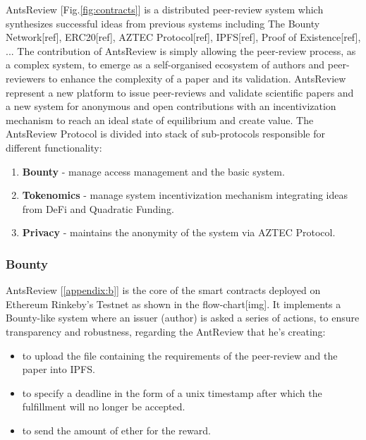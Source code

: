 \documentclass[runningheads]{llncs}
\begin{document}
AntsReview [Fig.\ref{fig:contracts}] is a distributed peer-review system which synthesizes successful ideas from previous systems including The Bounty Network[ref], ERC20[ref], AZTEC Protocol[ref], IPFS[ref], Proof of Existence[ref], ...
\newline The contribution of AntsReview is simply allowing the peer-review process, as a complex system, to emerge as a self-organised ecosystem of authors and peer-reviewers to enhance the complexity of a paper and its validation.
\newline AntsReview represent a new platform to issue peer-reviews and validate scientific papers and a new system for anonymous and open contributions with an incentivization mechanism to reach an ideal state of equilibrium and create value.
\newline The AntsReview Protocol is divided into stack of sub-protocols responsible for different functionality:

\begin{enumerate}
  \item \textbf{Bounty} - manage access management and the basic system.
  \item \textbf{Tokenomics} - manage system incentivization mechanism integrating ideas from DeFi and Quadratic Funding.
  \item \textbf{Privacy} - maintains the anonymity of the system via AZTEC Protocol.
\end{enumerate}

\subsubsection{Bounty}
AntsReview [\ref{appendix:b}] is the core of the smart contracts deployed on Ethereum Rinkeby's Testnet as shown in the flow-chart[img].
\newline It implements a Bounty-like system where an issuer (author) is asked a series of actions, to ensure transparency and robustness, regarding the AntReview that he's creating:
\begin{itemize}
  \item to upload the file containing the requirements of the peer-review and the paper into IPFS.
  \item to specify a deadline in the form of a unix timestamp after which the fulfillment will no longer be accepted.
  \item to send the amount of ether for the reward.
\end{itemize}
\end{document}
